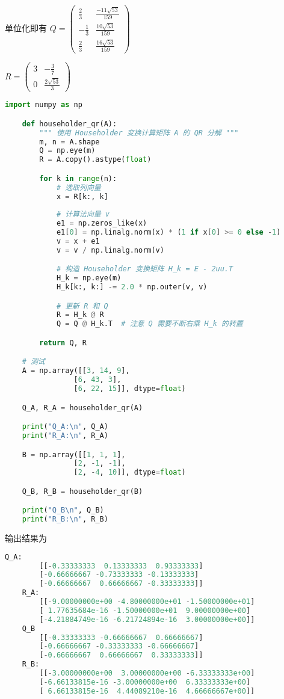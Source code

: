 \documentclass{article}
\begin{document}
单位化即有 $Q = \begin{pmatrix}
    \frac{2}{3} & \frac{-11\sqrt{53}}{159} \\
    -\frac{1}{3} & \frac{10\sqrt{53}}{159} \\
    \frac{2}{3} & \frac{16\sqrt{53}}{159}
\end{pmatrix}$

$R = \begin{pmatrix}
    3 & -\frac{3}{7} \\
    0 & \frac{2\sqrt{53}}{3}
\end{pmatrix}$

\begin{lstlisting}[style=codestyle, language=Python, title=Householder 变换计算 QR 分解代码]
    import numpy as np

    def householder_qr(A):
        """ 使用 Householder 变换计算矩阵 A 的 QR 分解 """
        m, n = A.shape
        Q = np.eye(m)
        R = A.copy().astype(float)

        for k in range(n):
            # 选取列向量
            x = R[k:, k]
            
            # 计算法向量 v
            e1 = np.zeros_like(x)
            e1[0] = np.linalg.norm(x) * (1 if x[0] >= 0 else -1)
            v = x + e1
            v = v / np.linalg.norm(v)

            # 构造 Householder 变换矩阵 H_k = E - 2uu.T
            H_k = np.eye(m)
            H_k[k:, k:] -= 2.0 * np.outer(v, v)

            # 更新 R 和 Q
            R = H_k @ R
            Q = Q @ H_k.T  # 注意 Q 需要不断右乘 H_k 的转置

        return Q, R

    # 测试
    A = np.array([[3, 14, 9],
                [6, 43, 3],
                [6, 22, 15]], dtype=float)

    Q_A, R_A = householder_qr(A)

    print("Q_A:\n", Q_A)
    print("R_A:\n", R_A)

    B = np.array([[1, 1, 1],
                [2, -1, -1],
                [2, -4, 10]], dtype=float)

    Q_B, R_B = householder_qr(B)

    print("Q_B\n", Q_B)
    print("R_B:\n", R_B)
\end{lstlisting}

输出结果为

\begin{lstlisting}[style=codestyle, language=Python,title=输出结果]
    Q_A:
        [[-0.33333333  0.13333333  0.93333333]
        [-0.66666667 -0.73333333 -0.13333333]
        [-0.66666667  0.66666667 -0.33333333]]
    R_A:
        [[-9.00000000e+00 -4.80000000e+01 -1.50000000e+01]
        [ 1.77635684e-16 -1.50000000e+01  9.00000000e+00]
        [-4.21884749e-16 -6.21724894e-16  3.00000000e+00]]
    Q_B
        [[-0.33333333 -0.66666667  0.66666667]
        [-0.66666667 -0.33333333 -0.66666667]
        [-0.66666667  0.66666667  0.33333333]]
    R_B:
        [[-3.00000000e+00  3.00000000e+00 -6.33333333e+00]
        [-6.66133815e-16 -3.00000000e+00  6.33333333e+00]
        [ 6.66133815e-16  4.44089210e-16  4.66666667e+00]]
\end{lstlisting}
\end{document}

